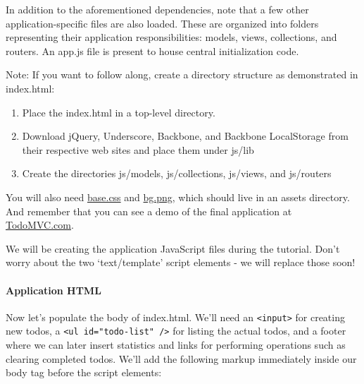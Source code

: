 \documentclass[9pt]{book}
\begin{document}
In addition to the aforementioned dependencies, note that a few other
application-specific files are also loaded. These are organized into
folders representing their application responsibilities: models, views,
collections, and routers. An app.js file is present to house central
initialization code.

Note: If you want to follow along, create a directory structure as
demonstrated in index.html:

\begin{enumerate}
\def\labelenumi{\arabic{enumi}.}
\itemsep1pt\parskip0pt
\item
  Place the index.html in a top-level directory.
\item
  Download jQuery, Underscore, Backbone, and Backbone LocalStorage from
  their respective web sites and place them under js/lib
\item
  Create the directories js/models, js/collections, js/views, and
  js/routers
\end{enumerate}

You will also need
\href{https://raw2.github.com/tastejs/todomvc/gh-pages/architecture-examples/backbone/bower_components/todomvc-common/base.css}{base.css}
and
\href{https://raw2.github.com/tastejs/todomvc/gh-pages/architecture-examples/backbone/bower_components/todomvc-common/bg.png}{bg.png},
which should live in an assets directory. And remember that you can see
a demo of the final application at
\href{http://todomvc.com}{TodoMVC.com}.

We will be creating the application JavaScript files during the
tutorial. Don't worry about the two `text/template' script elements - we
will replace those soon!

\paragraph{Application HTML}\label{application-html}

Now let's populate the body of index.html. We'll need an
\texttt{\textless{}input\textgreater{}} for creating new todos, a
\texttt{\textless{}ul id="todo-list" /\textgreater{}} for listing the
actual todos, and a footer where we can later insert statistics and
links for performing operations such as clearing completed todos. We'll
add the following markup immediately inside our body tag before the
script elements:
\end{document}
